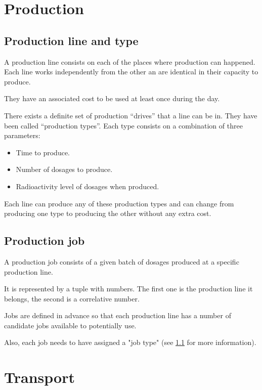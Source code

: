 \section{Production}

\subsection{Production line and type}
\label{def:lines}

A production line consists on each of the places where production can happened. Each line works independently from the other an are identical in their capacity to produce.

They have an associated cost to be used at least once during the day.

There exists a definite set of production "`drives"' that a line can be in. They have been called "`production types"'. Each type consists on a combination of three parameters:

\begin{itemize}
	\item Time to produce.
	\item Number of dosages to produce.
	\item Radioactivity level of dosages when produced.
\end{itemize}

Each line can produce any of these production types and can change from producing one type to producing the other without any extra cost.

\subsection{Production job}

A production job consists of a given batch of dosages produced at a specific production line.

It is represented by a tuple with numbers. The first one is the production line it belongs, the second is a correlative number.

Jobs are defined in advance so that each production line has a number of candidate jobs available to potentially use.

Also, each job needs to have assigned a "job type" (see \ref{def:lines} for more information).

\section{Transport}

